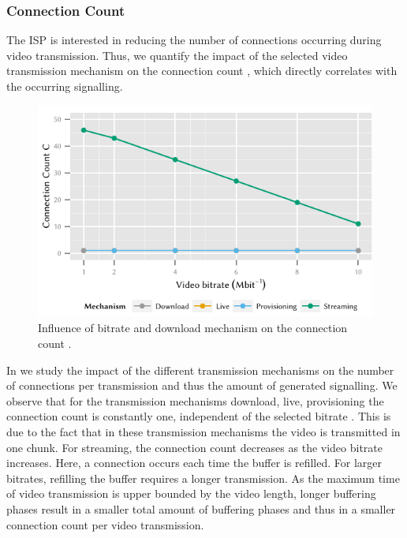 \subsubsection*{Connection Count}\label{sec:application:lte_video:connection_count}
The \gls{ISP} is interested in reducing the number of connections occurring during video transmission.
Thus, we quantify the impact of the selected video transmission mechanism on the connection count \connectioncount, which directly correlates with the occurring signalling.

\begin{figure}
  \centering
  \includegraphics{application/lte_video/numerical_evaluation/figures/bitrate2connections}
  \caption{Influence of bitrate and download mechanism on the connection count \connectioncount.}
  \label{fig:application:lte_video:numerical_evaluation:energy_consumption:bitrate2connections}
\end{figure}

In  we study the impact of the different transmission mechanisms on the number of connections per transmission and thus the amount of generated signalling.
We observe that for the transmission mechanisms download, live, provisioning the connection count \connectioncount is constantly one, independent of the selected bitrate \bitrate.
This is due to the fact that in these transmission mechanisms the video is transmitted in one chunk.
For streaming, the connection count \connectioncount decreases as the video bitrate increases.
Here, a connection occurs each time the buffer is refilled.
For larger bitrates, refilling the buffer requires a longer transmission.
As the maximum time of video transmission is upper bounded by the video length, longer buffering phases result in a smaller total amount of buffering phases and thus in a smaller connection count \connectioncount per video transmission.

